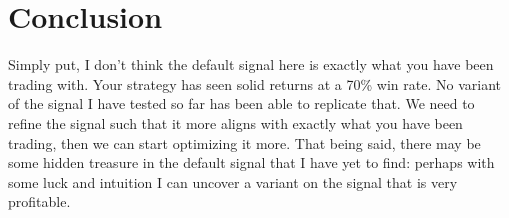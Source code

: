 \documentclass{article}
\begin{document}
\section{Conclusion}

Simply put, I don't think the default signal here is exactly what you have been trading with. Your strategy has seen solid returns at a 70\% win rate. No variant of the signal I have tested so far has been able to replicate that. We need to refine the signal such that it more aligns with exactly what you have been trading, then we can start optimizing it more. That being said, there may be some hidden treasure in the default signal that I have yet to find: perhaps with some luck and intuition I can uncover a variant on the signal that is very profitable.
\end{document}
